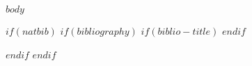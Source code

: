 \documentclass[utf8]{frontiers_suppmat} %
\begin{document}
\onecolumn
{}

\title[$title$]{{}}


\maketitle

$body$

$if(natbib)$
$if(bibliography)$
$if(biblio-title)$
\renewcommand\refname{$biblio-title$}
$endif$


$endif$
$endif$
\end{document}
